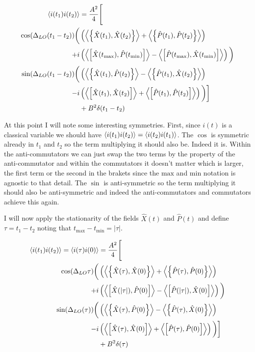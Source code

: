\documentclass[12pt]{article}
\newcommand{\braketacomm}[1]{\left\langle\left\{#1\right\} \right\rangle}
\newcommand{\braketcomm}[1]{\left\langle\left[#1\right] \right\rangle}
\begin{document}
\begin{align}
\Braket{i(t_1)i(t_2)} &= \frac{A^2}{4}\Bigg[\\
\cos(\Delta_{LO}(t_1-t_2))\bigg(&\left(\braketacomm{\hat{X}(t_1),\hat{X}(t_2)} + \braketacomm{\hat{P}(t_1),\hat{P}(t_2)}\right) \\
+i&\left(\braketcomm{\hat{X}(t_{\text{max}}),\hat{P}(t_{\text{min}})} - \braketcomm{\hat{P}(t_{\text{max}}),\hat{X}(t_{\text{min}}) }  \right)\bigg)\\
\sin(\Delta_{LO}(t_1-t_2))\bigg(&\left(\braketacomm{\hat{X}(t_1),\hat{P}(t_2)} - \braketacomm{\hat{P}(t_1),\hat{X}(t_2)}\right) \\
-i&\left(\braketcomm{\hat{X}(t_1),\hat{X}(t_2)} + \braketcomm{\hat{P}(t_1),\hat{P}(t_2)} \right)\bigg)\bigg]\\
&+B^2\delta(t_1-t_2)
\end{align}

At this point I will note some interesting symmetries. First, since $i(t)$ is a classical variable we should have $\Braket{i(t_1)i(t_2)} = \Braket{i(t_2)i(t_1)}$. The $\cos$ is symmetric already in $t_1$ and $t_2$ so the term multiplying it should also be. Indeed it is. Within the anti-commutators we can just swap the two terms by the property of the anti-commutator and within the commutators it doesn't matter which is larger, the first term or the second in the brakets since the $\text{max}$ and $\text{min}$ notation is agnostic to that detail. The $\sin$ is anti-symmetric so the term multiplying it should also be anti-symmetric and indeed the anti-commutators and commutators achieve this again.

I will now apply the stationarity of the fields $\hat{X}(t)$ and $\hat{P}(t)$ and define $\tau = t_1-t_2$ noting that $t_{\text{max}} - t_{\text{min}} = |\tau|$.

\begin{align}
\Braket{i(t_1)i(t_2)} = \Braket{i(\tau)i(0)} &= \frac{A^2}{4}\Bigg[\\
\cos(\Delta_{LO}\tau)\bigg(&\left(\braketacomm{\hat{X}(\tau),\hat{X}(0)} + \braketacomm{\hat{P}(\tau),\hat{P}(0)}\right) \\
+i&\left(\braketcomm{\hat{X}(|\tau|),\hat{P}(0)} - \braketcomm{\hat{P}(|\tau|),\hat{X}(0)}  \right)\bigg)\\
\sin(\Delta_{LO}(\tau))\bigg(&\left(\braketacomm{\hat{X}(\tau),\hat{P}(0)} - \braketacomm{\hat{P}(\tau),\hat{X}(0)}\right) \\
-i&\left(\braketcomm{\hat{X}(\tau),\hat{X}(0)} + \braketcomm{\hat{P}(\tau),\hat{P}(0)}  \right)\bigg)\bigg]\\
&+B^2\delta(\tau)
\end{align}
\end{document}
